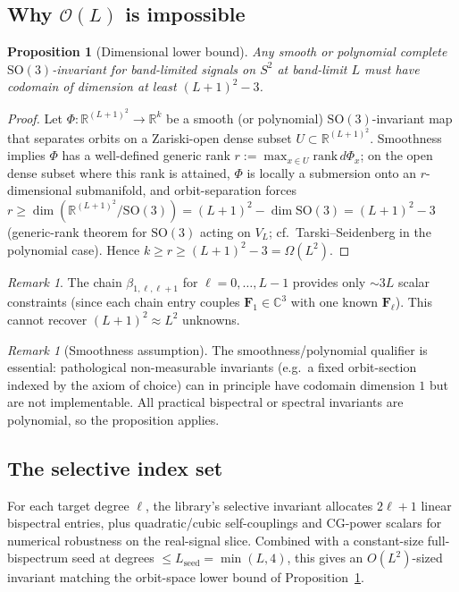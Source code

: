 \documentclass{article}
\newtheorem{proposition}[theorem]{Proposition}
\theoremstyle{definition}
\theoremstyle{remark}
\newtheorem{remark}[theorem]{Remark}
\newcommand{\R}{\mathbb{R}}
\newcommand{\C}{\mathbb{C}}
\newcommand{\SO}{\mathrm{SO}}
\theoremstyle{definition}
\begin{document}
\subsection{Why $\mathcal{O}(L)$ is impossible}
\label{sec:app-lower-bound}

\begin{proposition}[Dimensional lower bound]\label{prop:app-lower-bound}
Any \emph{smooth or polynomial} complete $\SO(3)$-invariant for
band-limited signals on $S^2$ at band-limit $L$ must have codomain
of dimension at least $(L+1)^2 - 3$.
\end{proposition}
\begin{proof}
Let $\Phi : \R^{(L+1)^2} \to \R^k$ be a smooth (or polynomial)
$\SO(3)$-invariant map that separates orbits on a Zariski-open
dense subset $U\subset\R^{(L+1)^2}$. Smoothness implies $\Phi$ has a
well-defined generic rank $r := \max_{x\in U} \mathrm{rank}\,
d\Phi_x$; on the open dense subset where this rank is attained,
$\Phi$ is locally a submersion onto an $r$-dimensional submanifold,
and orbit-separation forces $r \ge \dim(\R^{(L+1)^2}/\SO(3))
= (L+1)^2 - \dim\SO(3) = (L+1)^2 - 3$
(generic-rank theorem for $\SO(3)$ acting on $V_L$;
cf.~Tarski--Seidenberg in the polynomial case). Hence
$k \ge r \ge (L+1)^2 - 3 = \Omega(L^2)$.
\end{proof}

\begin{remark}
The chain $\beta_{1,\ell,\ell+1}$ for $\ell = 0, \dotsc, L-1$ provides
only $\sim 3L$ scalar constraints (since each chain entry couples
$\mathbf{F}_1 \in \C^3$ with one known $\mathbf{F}_\ell$). This cannot
recover $(L+1)^2 \approx L^2$ unknowns.
\end{remark}

\begin{remark}[Smoothness assumption]
The smoothness/polynomial qualifier is essential: pathological
non-measurable invariants (e.g.\ a fixed orbit-section indexed by
the axiom of choice) can in principle have codomain dimension $1$
but are not implementable. All practical bispectral or spectral
invariants are polynomial, so the proposition applies.
\end{remark}

\subsection{The selective index set}
\label{sec:app-selective-index}

For each target degree $\ell$, the library's selective invariant
allocates $2\ell{+}1$ linear bispectral entries, plus quadratic/cubic
self-couplings and CG-power scalars for numerical robustness on the
real-signal slice. Combined with a constant-size full-bispectrum seed
at degrees $\le L_{\mathrm{seed}}=\min(L,4)$, this gives an
$O(L^2)$-sized invariant matching the orbit-space lower bound of
Proposition~\ref{prop:app-lower-bound}.
\end{document}
